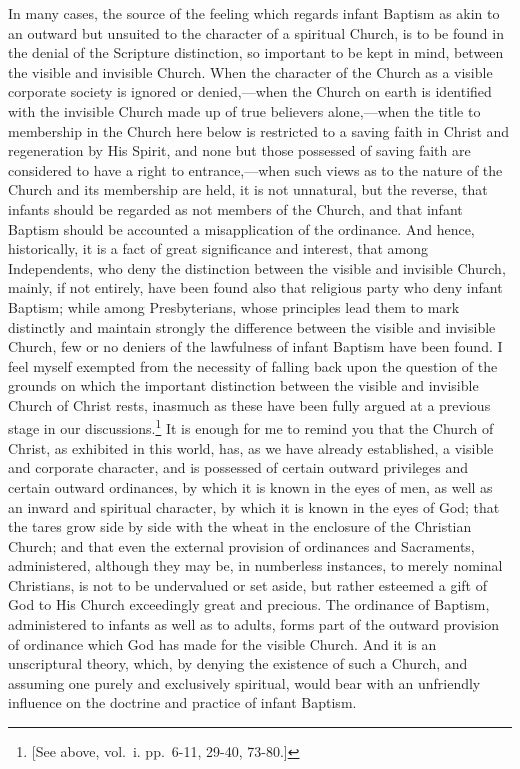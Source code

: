 \documentclass[]{book}
\begin{document}
In many cases, the source of the feeling which regards infant Baptism as akin to an outward but unsuited to the character of a spiritual Church, is to be found in the denial of the Scripture distinction, so important to be kept in mind, between the visible and invisible Church. When the character of the Church as a visible corporate society is ignored or denied,---when the Church on earth is identified with the invisible Church made up of true believers alone,---when the title to membership in the Church here below is restricted to a saving faith in Christ and regeneration by His Spirit, and none but those possessed of saving faith are considered to have a right to entrance,---when such views as to the nature of the Church and its membership are held, it is not unnatural, but the reverse, that infants should be regarded as not members of the Church, and that infant Baptism should be accounted a misapplication of the ordinance. And hence, historically, it is a fact of great significance and interest, that among Independents, who deny the distinction between the visible and invisible Church, mainly, if not entirely, have been found also that religious party who deny infant Baptism; while among Presbyterians, whose principles lead them to mark distinctly and maintain strongly the difference between the visible and invisible Church, few or no deniers of the lawfulness of infant Baptism have been found. I feel myself exempted from the necessity of falling back upon the question of the grounds on which the important distinction between the visible and invisible Church of Christ rests, inasmuch as these have been fully argued at a previous stage in our discussions.\footnote{{[}See above, vol.~i. pp.~6-11, 29-40, 73-80.{]}} It is enough for me to remind you that the Church of Christ, as exhibited in this world, has, as we have already established, a visible and corporate character, and is possessed of certain outward privileges and certain outward ordinances, by which it is known in the eyes of men, as well as an inward and spiritual character, by which it is known in the eyes of God; that the tares grow side by side with the wheat in the enclosure of the Christian Church; and that even the external provision of ordinances and Sacraments, administered, although they may be, in numberless instances, to merely nominal Christians, is not to be undervalued or set aside, but rather esteemed a gift of God to His Church exceedingly great and precious. The ordinance of Baptism, administered to infants as well as to adults, forms part of the outward provision of ordinance which God has made for the visible Church. And it is an unscriptural theory, which, by denying the existence of such a Church, and assuming one purely and exclusively spiritual, would bear with an unfriendly influence on the doctrine and practice of infant Baptism.
\end{document}
